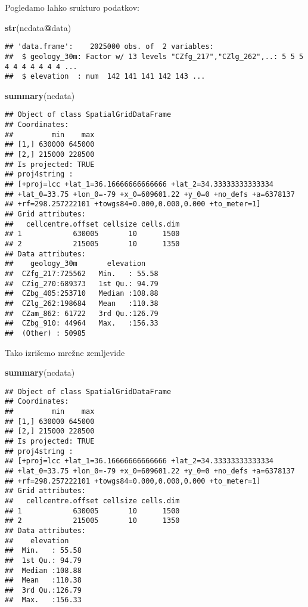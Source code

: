 \documentclass[]{article}
\newenvironment{Shaded}{\begin{snugshade}}{\end{snugshade}}
\newcommand{\KeywordTok}[1]{\textcolor[rgb]{0.13,0.29,0.53}{\textbf{#1}}}
\newcommand{\OperatorTok}[1]{\textcolor[rgb]{0.81,0.36,0.00}{\textbf{#1}}}
\newcommand{\NormalTok}[1]{#1}
\begin{document}
Pogledamo lahko srukturo podatkov:

\begin{Shaded}
\begin{Highlighting}[]
\KeywordTok{str}\NormalTok{(ncdata}\OperatorTok{@}\NormalTok{data)}
\end{Highlighting}
\end{Shaded}

\begin{verbatim}
## 'data.frame':    2025000 obs. of  2 variables:
##  $ geology_30m: Factor w/ 13 levels "CZfg_217","CZlg_262",..: 5 5 5 4 4 4 4 4 4 4 ...
##  $ elevation  : num  142 141 141 142 143 ...
\end{verbatim}

\begin{Shaded}
\begin{Highlighting}[]
\KeywordTok{summary}\NormalTok{(ncdata)}
\end{Highlighting}
\end{Shaded}

\begin{verbatim}
## Object of class SpatialGridDataFrame
## Coordinates:
##         min    max
## [1,] 630000 645000
## [2,] 215000 228500
## Is projected: TRUE 
## proj4string :
## [+proj=lcc +lat_1=36.16666666666666 +lat_2=34.33333333333334
## +lat_0=33.75 +lon_0=-79 +x_0=609601.22 +y_0=0 +no_defs +a=6378137
## +rf=298.257222101 +towgs84=0.000,0.000,0.000 +to_meter=1]
## Grid attributes:
##   cellcentre.offset cellsize cells.dim
## 1            630005       10      1500
## 2            215005       10      1350
## Data attributes:
##    geology_30m       elevation     
##  CZfg_217:725562   Min.   : 55.58  
##  CZig_270:689373   1st Qu.: 94.79  
##  CZbg_405:253710   Median :108.88  
##  CZlg_262:198684   Mean   :110.38  
##  CZam_862: 61722   3rd Qu.:126.79  
##  CZbg_910: 44964   Max.   :156.33  
##  (Other) : 50985
\end{verbatim}

Tako izrišemo mrežne zemljevide

\begin{Shaded}
\begin{Highlighting}[]
\KeywordTok{summary}\NormalTok{(ncdata)}
\end{Highlighting}
\end{Shaded}

\begin{verbatim}
## Object of class SpatialGridDataFrame
## Coordinates:
##         min    max
## [1,] 630000 645000
## [2,] 215000 228500
## Is projected: TRUE 
## proj4string :
## [+proj=lcc +lat_1=36.16666666666666 +lat_2=34.33333333333334
## +lat_0=33.75 +lon_0=-79 +x_0=609601.22 +y_0=0 +no_defs +a=6378137
## +rf=298.257222101 +towgs84=0.000,0.000,0.000 +to_meter=1]
## Grid attributes:
##   cellcentre.offset cellsize cells.dim
## 1            630005       10      1500
## 2            215005       10      1350
## Data attributes:
##    elevation     
##  Min.   : 55.58  
##  1st Qu.: 94.79  
##  Median :108.88  
##  Mean   :110.38  
##  3rd Qu.:126.79  
##  Max.   :156.33
\end{verbatim}
\end{document}
